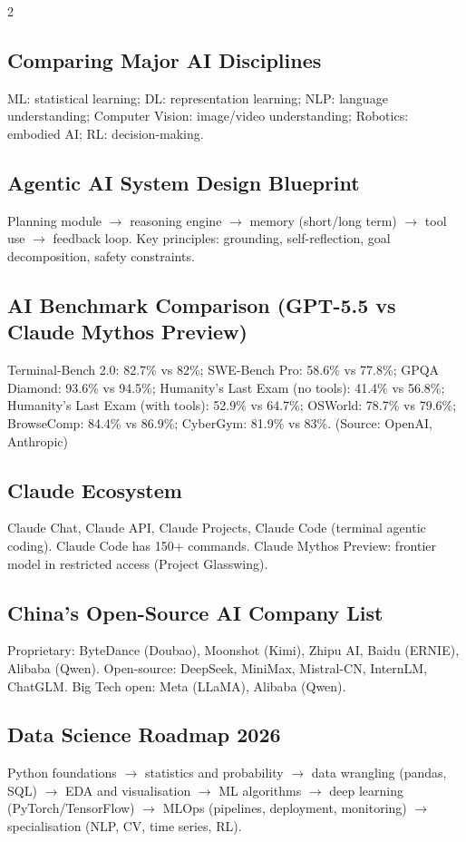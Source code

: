 \documentclass[10pt,a4paper]{article}
\begin{document}
\begin{multicols}{2}
\subsection{Comparing Major AI Disciplines}
ML: statistical learning; DL: representation learning; NLP: language understanding; Computer Vision: image/video understanding; Robotics: embodied AI; RL: decision-making.

\subsection{Agentic AI System Design Blueprint}
Planning module $\to$ reasoning engine $\to$ memory (short/long term) $\to$ tool use $\to$ feedback loop. Key principles: grounding, self-reflection, goal decomposition, safety constraints.

\subsection{AI Benchmark Comparison (GPT-5.5 vs Claude Mythos Preview)}
Terminal-Bench 2.0: 82.7\% vs 82\%; SWE-Bench Pro: 58.6\% vs 77.8\%; GPQA Diamond: 93.6\% vs 94.5\%; Humanity's Last Exam (no tools): 41.4\% vs 56.8\%; Humanity's Last Exam (with tools): 52.9\% vs 64.7\%; OSWorld: 78.7\% vs 79.6\%; BrowseComp: 84.4\% vs 86.9\%; CyberGym: 81.9\% vs 83\%. (Source: OpenAI, Anthropic)

\subsection{Claude Ecosystem}
Claude Chat, Claude API, Claude Projects, Claude Code (terminal agentic coding). Claude Code has 150+ commands. Claude Mythos Preview: frontier model in restricted access (Project Glasswing).

\subsection{China's Open-Source AI Company List}
Proprietary: ByteDance (Doubao), Moonshot (Kimi), Zhipu AI, Baidu (ERNIE), Alibaba (Qwen). Open-source: DeepSeek, MiniMax, Mistral-CN, InternLM, ChatGLM. Big Tech open: Meta (LLaMA), Alibaba (Qwen).

\subsection{Data Science Roadmap 2026}
Python foundations $\to$ statistics and probability $\to$ data wrangling (pandas, SQL) $\to$ EDA and visualisation $\to$ ML algorithms $\to$ deep learning (PyTorch/TensorFlow) $\to$ MLOps (pipelines, deployment, monitoring) $\to$ specialisation (NLP, CV, time series, RL).


\end{multicols}
\end{document}
